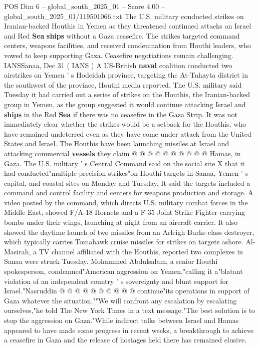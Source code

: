 \begin{textsample}{POS Dim 6 – global\_south\_2025\_01 – Score 4.00 – global\_south\_2025\_01/119501066.txt}  \label{ex:f6_pos_356}
The U.S. military conducted strikes on Iranian-backed Houthis in Yemen as they threatened continued attacks on Israel and Red \textbf{Sea} \textbf{ships} without a Gaza ceasefire.
The strikes targeted command centers, weapons facilities, and received condemnation from Houthi leaders, who vowed to keep supporting Gaza.
Ceasefire negotiations remain challenging.
IANSSanaa, Dec 31 ( IANS ) A US-British \textbf{naval} coalition conducted two airstrikes on Yemen ' s Hodeidah province, targeting the At-Tuhayta district in the southwest of the province, Houthi media reported.
The U.S. military said Tuesday it had carried out a series of strikes on the Houthis, the Iranian-backed group in Yemen, as the group suggested it would continue attacking Israel and \textbf{ships} in the Red \textbf{Sea} if there was no ceasefire in the Gaza Strip.
It was not immediately clear whether the strikes would be a setback for the Houthis, who have remained undeterred even as they have come under attack from the United States and Israel.
The Houthis have been launching missiles at Israel and attacking commercial \textbf{vessels} they claim @ @ @ @ @ @ @ @ @ @ Hamas, in Gaza.
The U.S. military ' s Central Command said on the social site X that it had conducted"multiple precision strikes"on Houthi targets in Sanaa, Yemen ' s capital, and coastal sites on Monday and Tuesday.
It said the targets included a command and control facility and centers for weapons production and storage.
A video posted by the command, which directs U.S. military combat forces in the Middle East, showed F/A-18 Hornets and a F-35 Joint Strike Fighter carrying bombs under their wings, launching at night from an aircraft carrier.
It also showed the daytime launch of two missiles from an Arleigh Burke-class destroyer, which typically carries Tomahawk cruise missiles for strikes on targets ashore.
Al-Masirah, a TV channel affiliated with the Houthis, reported two complexes in Sanaa were struck Tuesday.
Mohammed Abdulsalam, a senior Houthi spokesperson, condemned"American aggression on Yemen,"calling it a"blatant violation of an independent country ' s sovereignty and blunt support for Israel."Nasruddin @ @ @ @ @ @ @ @ @ @ continue"its operations in support of Gaza whatever the situation.""We will confront any escalation by escalating ourselves,"he told The New York Times in a text message."The best solution is to stop the aggression on Gaza."While indirect talks between Israel and Hamas appeared to have made some progress in recent weeks, a breakthrough to achieve a ceasefire in Gaza and the release of hostages held there has remained elusive.

\end{textsample}
